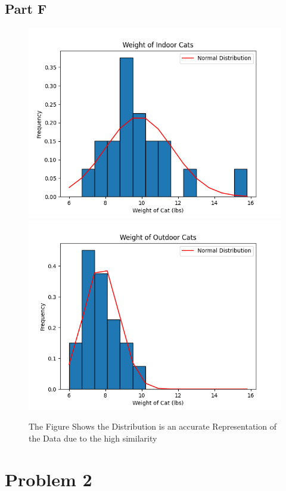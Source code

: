 \documentclass[]{report}
\begin{document}
\subsection{Part F}


\begin{figure}[H]
	\centering
	\includegraphics[width=1\linewidth]{pics/1.f.in}
	\includegraphics[width=1\linewidth]{pics/1.f.out}
	\caption{The Figure Shows the Distribution is an accurate Representation of the Data due to the high similarity}
	\label{fig:5}
\end{figure}

\section{Problem 2}
\end{document}
